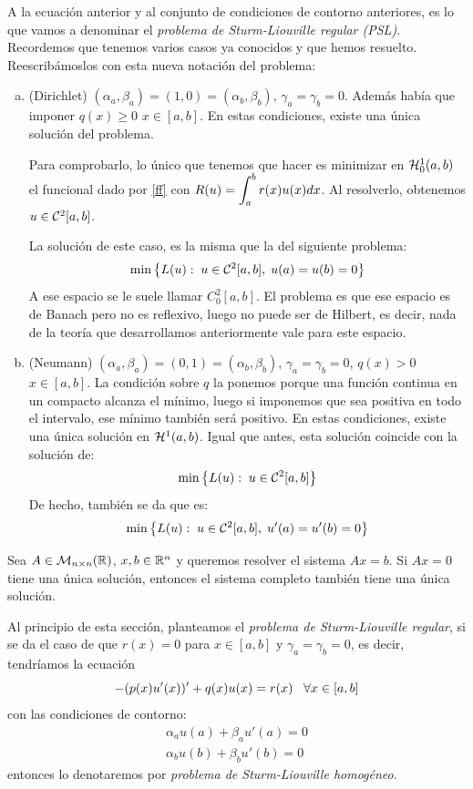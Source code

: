 A la ecuación anterior y al conjunto de condiciones de contorno anteriores, es lo que vamos a denominar el \textit{problema de Sturm-Liouville regular (PSL)}. Recordemos que tenemos varios casos ya conocidos y que hemos resuelto. Reescribámoslos con esta nueva notación del problema:
\begin{enumerate}[(a)]
\item (Dirichlet) $(\alpha_a,\beta_a)=(1,0)=(\alpha_b,\beta_b)$, $\gamma_a=\gamma_b=0$. Además había que imponer $q(x)\geq 0$ $x\in[a,b]$. En estas condiciones, existe una única solución del problema.

Para comprobarlo, lo único que tenemos que hacer es minimizar en $\sobolevcero{1}$ el funcional dado por \eqref{ff} con $R(u)=\integral{a}{b}{r(x)u(x)dx}$. Al resolverlo, obtenemos $u\in\continuas[2]$.

La solución de este caso, es la misma que la del siguiente problema:
\[
\min\left\{L(u):\; u\in\continuas[2],\; u(a)=u(b)=0\right\}
\]
A ese espacio se le suele llamar $C_0^2[a,b]$. El problema es que ese espacio es de Banach pero no es reflexivo, luego no puede ser de Hilbert, es decir, nada de la teoría que desarrollamos anteriormente vale para este espacio.

\item (Neumann) $(\alpha_a,\beta_a)=(0,1)=(\alpha_b,\beta_b)$, $\gamma_a=\gamma_b=0$, $q(x)>0$ $x\in[a,b].$ La condición sobre $q$ la ponemos porque una función continua en un compacto alcanza el mínimo, luego si imponemos que sea positiva en todo el intervalo, ese mínimo también será positivo. En estas condiciones, existe una única solución en $\sobolev{1}$. Igual que antes, esta solución coincide con la solución de:
\[
\min\left\{L(u):\; u\in\continuas[2]\right\}
\]
De hecho, también se da que es:
\[
\min\left\{L(u):\; u\in\continuas[2],\; u'(a)=u'(b)=0\right\}
\]
\end{enumerate}

\begin{remark}
Sea $A\in\mathcal{M}_{n\times n}(\R)$, $x,b\in\R^n$ y queremos resolver el sistema $Ax=b$. Si $Ax=0$  tiene una única solución, entonces el sistema completo también tiene una única solución.
\end{remark}

Al principio de esta sección, planteamos el \textit{problema de Sturm-Liouville regular}, si se da el caso de que $r(x)=0$ para $x\in[a,b]$ y $\gamma_a=\gamma_b=0$, es decir, tendríamos la ecuación
\[
-(p(x)u'(x))'+q(x)u(x)=r(x) \espacio \forall x\in[a,b]
\]
con las condiciones de contorno:
\[
\begin{array}{c}
\alpha_au(a)+\beta_au'(a)=0\\
\alpha_bu(b)+\beta_bu'(b)=0
\end{array}
\]
entonces lo denotaremos por \textit{problema de Sturm-Liouville homogéneo}.

